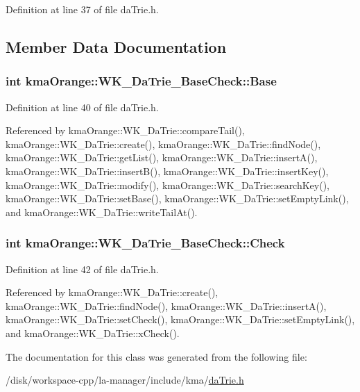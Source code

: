 Definition at line 37 of file daTrie.h.

\subsection{Member Data Documentation}
\hypertarget{classkmaOrange_1_1WK__DaTrie__BaseCheck_3c4a8897a2784e2c1870ecfee3bc06e6}{
\subsubsection[{Base}]{\setlength{\rightskip}{0pt plus 5cm}int {\bf kmaOrange::WK\_\-DaTrie\_\-BaseCheck::Base}}}
\label{classkmaOrange_1_1WK__DaTrie__BaseCheck_3c4a8897a2784e2c1870ecfee3bc06e6}




Definition at line 40 of file daTrie.h.

Referenced by kmaOrange::WK\_\-DaTrie::compareTail(), kmaOrange::WK\_\-DaTrie::create(), kmaOrange::WK\_\-DaTrie::findNode(), kmaOrange::WK\_\-DaTrie::getList(), kmaOrange::WK\_\-DaTrie::insertA(), kmaOrange::WK\_\-DaTrie::insertB(), kmaOrange::WK\_\-DaTrie::insertKey(), kmaOrange::WK\_\-DaTrie::modify(), kmaOrange::WK\_\-DaTrie::searchKey(), kmaOrange::WK\_\-DaTrie::setBase(), kmaOrange::WK\_\-DaTrie::setEmptyLink(), and kmaOrange::WK\_\-DaTrie::writeTailAt().\hypertarget{classkmaOrange_1_1WK__DaTrie__BaseCheck_5f377e2e67746ca2f6cc1701411f1e56}{
\subsubsection[{Check}]{\setlength{\rightskip}{0pt plus 5cm}int {\bf kmaOrange::WK\_\-DaTrie\_\-BaseCheck::Check}}}
\label{classkmaOrange_1_1WK__DaTrie__BaseCheck_5f377e2e67746ca2f6cc1701411f1e56}




Definition at line 42 of file daTrie.h.

Referenced by kmaOrange::WK\_\-DaTrie::create(), kmaOrange::WK\_\-DaTrie::findNode(), kmaOrange::WK\_\-DaTrie::insertA(), kmaOrange::WK\_\-DaTrie::setCheck(), kmaOrange::WK\_\-DaTrie::setEmptyLink(), and kmaOrange::WK\_\-DaTrie::xCheck().

The documentation for this class was generated from the following file:\begin{CompactItemize}
\item 
/disk/workspace-cpp/la-manager/include/kma/\hyperlink{daTrie_8h}{daTrie.h}\end{CompactItemize}
